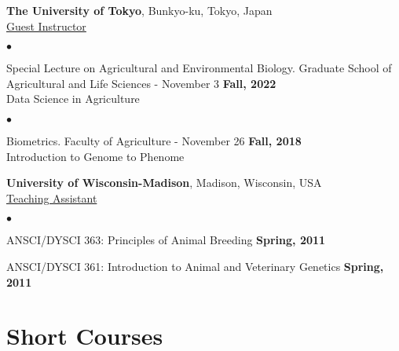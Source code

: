 \documentclass[margin,line,10pt]{res}
\newenvironment{list2}{
  \begin{list}{$\bullet$}{%
      \setlength{\itemsep}{0in}
      \setlength{\parsep}{0in} \setlength{\parskip}{0in}
      \setlength{\topsep}{0in} \setlength{\partopsep}{0in} 
      \setlength{\leftmargin}{0.2in}}}{\end{list}}
\begin{document}
\begin{resume}
  \vspace{1cm}

{\bf The University of Tokyo}, Bunkyo-ku, Tokyo, Japan \vspace{0.2cm} \\
\underline{Guest Instructor}


\vspace{0.4cm}
 \begin{list2}
 \item Special Lecture on Agricultural and Environmental Biology. Graduate School of Agricultural and Life Sciences - November 3  \hfill {\bf Fall, 2022} \\
   Data Science in Agriculture
\end{list2}


\vspace{0.4cm}
 \begin{list2}
 \item Biometrics. Faculty of Agriculture - November 26 \hfill {\bf Fall, 2018} \\
 Introduction to Genome to Phenome
 \end{list2}


 \vspace{1cm}
 
{\bf University of Wisconsin-Madison}, Madison, Wisconsin, USA  \vspace{0.2cm}  \\
\underline{Teaching Assistant} 
 \vspace{0.4cm}
\begin{list2}
\item ANSCI/DYSCI 363: Principles of Animal Breeding    \hfill {\bf Spring, 2011}

\vspace{0.5cm}

\item ANSCI/DYSCI 361: Introduction to Animal and Veterinary Genetics    \hfill {\bf Spring, 2011} 

  \end{list2}



\vspace{0.5cm}
\section{\sc Short Courses}
\vspace{1cm}




\section{}



\end{resume}
\end{document}
